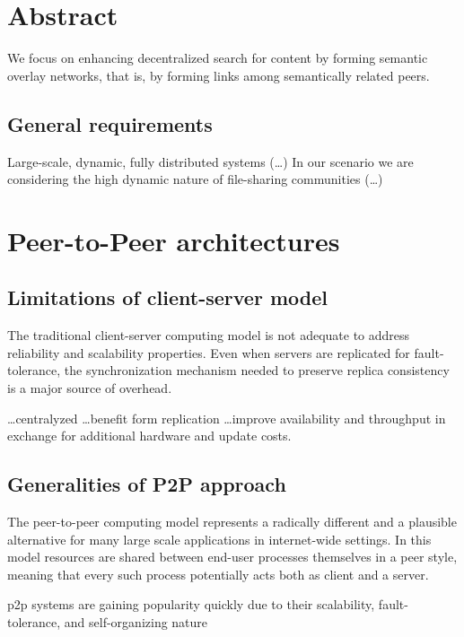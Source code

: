 \section{Abstract}

We focus on enhancing decentralized search for content by forming semantic overlay networks, that is, by forming links among semantically related peers.

\subsection{General requirements}
Large-scale, dynamic, fully distributed systems (\ldots) In our scenario we are considering the high dynamic nature of file-sharing communities (\ldots)


\section{Peer-to-Peer architectures}

\subsection{Limitations of client-server model}
The traditional client-server computing model is not adequate to address reliability and scalability properties. Even when servers are replicated for fault-tolerance, the synchronization mechanism needed to preserve replica consistency is a major source of overhead.

\ldots centralyzed \ldots benefit form replication \ldots improve availability and throughput in exchange for additional hardware and update costs.

\subsection{Generalities of P2P approach}
The peer-to-peer computing model represents a radically different and a plausible alternative for many large scale applications in internet-wide settings. In this model resources are shared between end-user processes themselves in a peer style, meaning that every such process potentially acts both as client and a server.

p2p systems are gaining popularity quickly due to their scalability, fault-tolerance, and self-organizing nature

